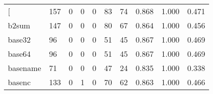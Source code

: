 \begin{longtable}{lp{2.0cm}p{2.0cm}p{2.0cm}p{2.0cm}p{2.0cm}p{2.0cm}p{2.0cm}p{2.0cm}p{2.0cm}}
\bottomrule
\endlastfoot
{[}         &                    157 &                                             0 &                                            0 &                                           0 &                                           83 &                                         74 &                                0.868 &                                  1.000 &                                0.471 \\
b2sum     &                    147 &                                             0 &                                            0 &                                           0 &                                           80 &                                         67 &                                0.864 &                                  1.000 &                                0.456 \\
base32    &                     96 &                                             0 &                                            0 &                                           0 &                                           51 &                                         45 &                                0.867 &                                  1.000 &                                0.469 \\
base64    &                     96 &                                             0 &                                            0 &                                           0 &                                           51 &                                         45 &                                0.867 &                                  1.000 &                                0.469 \\
basename  &                     71 &                                             0 &                                            0 &                                           0 &                                           47 &                                         24 &                                0.835 &                                  1.000 &                                0.338 \\
basenc    &                    133 &                                             0 &                                            1 &                                           0 &                                           70 &                                         62 &                                0.863 &                                  1.000 &                                0.466 \\

\end{longtable}
